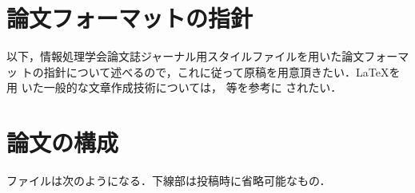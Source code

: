 \documentclass[submit,techreq,noauthor]{ec2021}
\begin{document}

\section{論文フォーマットの指針}
\label{sec:format}

以下，情報処理学会論文誌ジャーナル用スタイルファイルを用いた論文フォーマッ
トの指針について述べるので，これに従って原稿を用意頂きたい．\LaTeX を用
いた一般的な文章作成技術については，\cite{okumura, companion} 等を参考に
されたい．

\section{論文の構成}
\label{config}

ファイルは次のようになる．下線部は投稿時に省略可能なもの．
\end{document}
